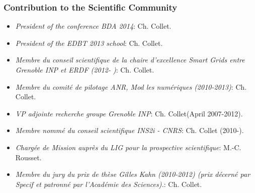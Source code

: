 
\subsubsection*{Contribution to the Scientific Community}


\begin{itemize}
\setlength{\itemindent}{-0.5cm}
\setlength{\itemsep}{-0.1cm}
\item {\it President of the conference BDA 2014}: Ch. Collet.

\item {\it President of the EDBT 2013 school}: Ch. Collet.

\item {\it Membre du conseil scientifique de la chaire d'excellence Smart Grids entre Grenoble INP et ERDF (2012- )}: Ch. Collet.

\item {\it Membre du comit{\'e} de pilotage ANR, Mod les num{\'e}riques (2010-2013)}: Ch. Collet.

\item {\it VP adjointe recherche groupe Grenoble INP}: Ch. Collet(April 2007-2012).

\item {\it Membre nomm{\'e}  du conseil scientifique INS2i - CNRS}: Ch. Collet (2010-).

\item {\it Charg{\'e}e de Mission aupr{\`e}s du LIG pour la prospective scientifique}: M.-C. Rousset.

\item {\it Membre du jury du prix de th{\`e}se Gilles Kahn (2010-2012)
(prix d{\'e}cern{\'e} par Specif et patronn{\'e} par l'Acad{\'e}mie des Sciences).}: Ch. Collet.



\end{itemize}

